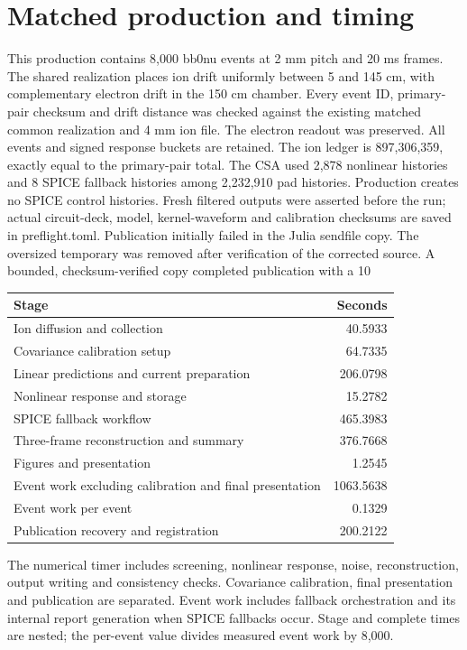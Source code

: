 \section{Matched production and timing}
This production contains 8,000 bb0nu events at 2 mm pitch and 20 ms frames. The shared realization places ion drift uniformly between 5 and 145 cm, with complementary electron drift in the 150 cm chamber. Every event ID, primary-pair checksum and drift distance was checked against the existing matched common realization and 4 mm ion file. The electron readout was preserved. All events and signed response buckets are retained. The ion ledger is 897,306,359, exactly equal to the primary-pair total. The CSA used 2,878 nonlinear histories and 8 SPICE fallback histories among 2,232,910 pad histories. Production creates no SPICE control histories. Fresh filtered outputs were asserted before the run; actual circuit-deck, model, kernel-waveform and calibration checksums are saved in preflight.toml. Publication initially failed in the Julia sendfile copy. The oversized temporary was removed after verification of the corrected source. A bounded, checksum-verified copy completed publication with a 10%
\begin{center}\small\begin{tabular}{p{11cm}r}\toprule Stage & Seconds\\\midrule
Ion diffusion and collection & 40.5933 \\
Covariance calibration setup & 64.7335 \\
Linear predictions and current preparation & 206.0798 \\
Nonlinear response and storage & 15.2782 \\
SPICE fallback workflow & 465.3983 \\
Three-frame reconstruction and summary & 376.7668 \\
Figures and presentation & 1.2545 \\
Event work excluding calibration and final presentation & 1063.5638 \\
Event work per event & 0.1329 \\
Publication recovery and registration & 200.2122 \\
\bottomrule\end{tabular}\end{center}
The numerical timer includes screening, nonlinear response, noise, reconstruction, output writing and consistency checks. Covariance calibration, final presentation and publication are separated. Event work includes fallback orchestration and its internal report generation when SPICE fallbacks occur. Stage and complete times are nested; the per-event value divides measured event work by 8,000.
